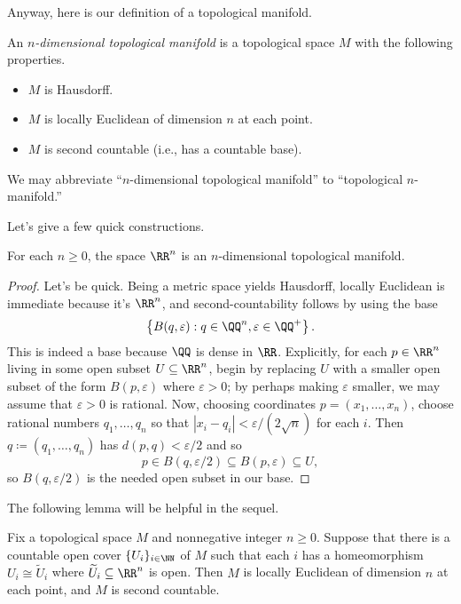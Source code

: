 \documentclass[../notes.tex]{subfiles}
\begin{document}
Anyway, here is our definition of a topological manifold.
\begin{definition}
	An \textit{$n$-dimensional topological manifold} is a topological space $M$ with the following properties.
	\begin{itemize}
		\item $M$ is Hausdorff.
		\item $M$ is locally Euclidean of dimension $n$ at each point.
		\item $M$ is second countable (i.e., has a countable base).
	\end{itemize}
	We may abbreviate ``$n$-dimensional topological manifold'' to ``topological $n$-manifold.''
\end{definition}
Let's give a few quick constructions.
\begin{lemma} \label{lem:rn-manifold}
	For each $n\ge0$, the space $\RR^n$ is an $n$-dimensional topological manifold.
\end{lemma}
\begin{proof}
	Let's be quick. Being a metric space yields Hausdorff, locally Euclidean is immediate because it's $\RR^n$, and second-countability follows by using the base
	\[\left\{B(q,\varepsilon):q\in\QQ^n,\varepsilon\in\QQ^+\right\}.\]
	This is indeed a base because $\QQ$ is dense in $\RR$. Explicitly, for each $p\in\RR^n$ living in some open subset $U\subseteq\RR^n$, begin by replacing $U$ with a smaller open subset of the form $B(p,\varepsilon)$ where $\varepsilon>0$; by perhaps making $\varepsilon$ smaller, we may assume that $\varepsilon>0$ is rational. Now, choosing coordinates $p=(x_1,\ldots,x_n)$, choose rational numbers $q_1,\ldots,q_n$ so that $\left|x_i-q_i\right|<\varepsilon/(2\sqrt n)$ for each $i$. Then $q\coloneqq(q_1,\ldots,q_n)$ has $d(p,q)<\varepsilon/2$ and so
	\[p\in B(q,\varepsilon/2)\subseteq B(p,\varepsilon)\subseteq U,\]
	so $B(q,\varepsilon/2)$ is the needed open subset in our base.
\end{proof}
The following lemma will be helpful in the sequel.
\begin{lemma} \label{lem:get-second-countable}
	Fix a topological space $M$ and nonnegative integer $n\ge0$. Suppose that there is a countable open cover $\{U_i\}_{i\in\NN}$ of $M$ such that each $i$ has a homeomorphism $U_i\cong\widetilde U_i$ where $\widetilde U_i\subseteq\RR^n$ is open. Then $M$ is locally Euclidean of dimension $n$ at each point, and $M$ is second countable.
\end{lemma}
\end{document}
